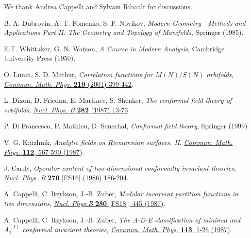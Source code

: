 \documentclass[a4paper,11pt]{article}
\begin{document}
\acknowledgments
We thank Andrea Cappelli and Sylvain Ribault for discussions.






\begin{thebibliography}{99}

 B. A. Dubrovin, A. T. Fomenko, S. P. Novikov, \textit{Modern Geometry---Methods and Applications Part II. The Geometry and Topology of Manifolds}, Springer (1985).

 E.T. Whittaker, G. N. Watson, \emph{A Course in Modern Analysis}, Cambridge University Press (1950).

 O. Lunin, S. D. Mathur, \emph{Correlation functions for $M(N)/S(N)$ orbifolds}, \href{https://doi.org/10.1007/s002200100431}{\emph{Commun. Math. Phys.} {\bf 219} (2001) 399-442}.

 L. Dixon, D. Friedan, E. Martinec, S. Shenker, \textit{The conformal field theory of orbifolds}, 
\href{https://doi.org/10.1016/0550-3213(87)90676-6}{\emph{Nucl. Phys. B} {\bf 282} (1987) 13-73}.

 P. Di Francesco, P. Mathieu, D. Senechal, \textit{Conformal field theory}, Springer (1999)

 V. G. Knizhnik, \emph{Analytic fields on Riemannian surfaces. II}, 
\href{https://doi.org/10.1007/BF01225373}{\emph{Commun. Math. Phys.} {\bf 112}, 567-590 (1987)}.

 J. Cardy, \emph{Operator content of two-dimensional conformally invariant theories}, 
\href{https://doi.org/10.1016/0550-3213(86)90552-3}{\emph{Nucl. Phys. B} {\bf 270} [FS16] (1986) 186-204}.

 A. Cappelli, C. Itzykson, J.-B. Zuber, \emph{Modular invariant partition functions in two dimensions}, 
\href{https://doi.org/10.1016/0550-3213(87)90155-6}{\emph{Nucl. Phys.B} {\bf 280} [FS18], 445 (1987)}.

 A. Cappelli, C. Itzykson, J.-B. Zuber, \emph{The A-D-E classification of minimal and $A_1^{(1)}$ conformal invariant theories}, \href{https://doi.org/10.1007/BF01221394}{\emph{Commun. Math. Phys.} {\bf 113}, 1-26 (1987)}.


\end{thebibliography}
\end{document}
